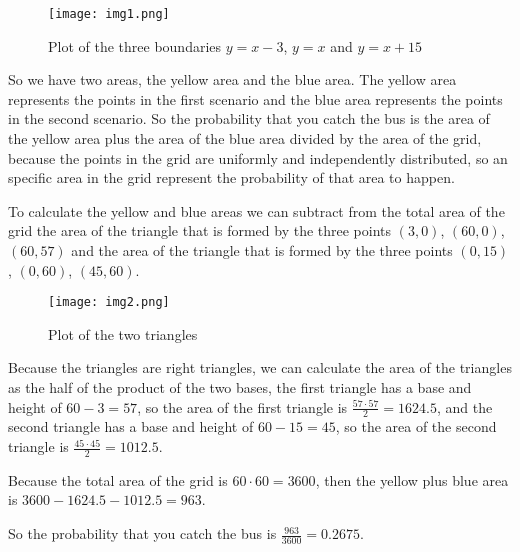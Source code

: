 \singlespacing

\break

\begin{figure}[h]
    \centering
    \texttt{[image: img1.png]}
    \caption{Plot of the three boundaries $y = x - 3$, $y = x$ and $y = x + 15$}
\end{figure}

\singlespacing
\singlespacing

So we have two areas, the yellow area and the blue area. The yellow area
represents the points in the first scenario and the blue area represents
the points in the second scenario. So the probability that you catch the
bus is the area of the yellow area plus the area of the blue area divided
by the area of the grid, because the points in the grid are uniformly and
independently distributed, so an specific area in the grid represent the
probability of that area to happen.

\singlespacing
\singlespacing

To calculate the yellow and blue areas we can subtract from the total
area of the grid the area of the triangle that is formed by the three
points $(3, 0)$, $(60, 0)$, $(60, 57)$ and the area of the triangle
that is formed by the three points $(0, 15)$, $(0, 60)$, $(45, 60)$.

\singlespacing
\singlespacing

\begin{figure}[h]
    \centering
    \texttt{[image: img2.png]}
    \caption{Plot of the two triangles}
\end{figure}

\break

Because the triangles are right triangles, we can calculate the area
of the triangles as the half of the product of the two bases, the first
triangle has a base and height of $60 - 3 = 57$,
so the area of the first triangle is $\frac{57 \cdot 57}{2} = 1624.5$,
and the second triangle has a base and height of $60 - 15 = 45$,
so the area of the second triangle is $\frac{45 \cdot 45}{2} = 1012.5$.

\singlespacing
\singlespacing

Because the total area of the grid is $60 \cdot 60 = 3600$, then the
yellow plus blue area is $3600 - 1624.5 - 1012.5 = 963$.

\singlespacing
\singlespacing
\singlespacing

So the probability that you catch the bus is $\frac{963}{3600} = 0.2675$.
